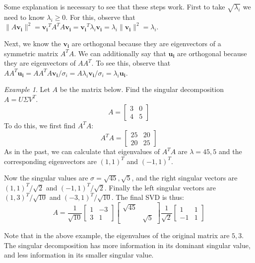 \documentclass[11pt,oneside]{amsbook}
\theoremstyle{definition}
\theoremstyle{plain}
\theoremstyle{definition}
\theoremstyle{remark}
\newtheorem{example}[theorem]{Example}
\numberwithin{equation}{section}
\numberwithin{figure}{section}
\begin{document}
Some explanation is necessary to see that these steps work. First to take $\sqrt{\lambda_i}$ we need to know $\lambda_i\geq0$. For this, observe that $\|A\mathbf{v_i}\|^2=\mathbf{v_i}^TA^TA\mathbf{v_i}=\mathbf{v_i}^T\lambda_i\mathbf{v_i}=\lambda_i\|\mathbf{v_i}\|^2=\lambda_i$.

Next, we know the $\mathbf{v_i}$ are orthogonal because they are eigenvectors of a symmetric matrix $A^TA$. We can additionally say that $\mathbf{u_i}$ are orthogonal because they are eigenvectors of $AA^T$. To see this, observe that $AA^T\mathbf{u_i}=AA^TA\mathbf{v_i}/\sigma_i=A\lambda_i\mathbf{v_i}/\sigma_i=\lambda_i\mathbf{u_i}$.

\begin{example}
  Let $A$ be the matrix below. Find the singular decomposition $A=U\Sigma V^T$.
  \[A=\begin{bmatrix}3&0\\4&5\end{bmatrix}
  \]
  To do this, we first find $A^TA$:
  \[A^TA=\begin{bmatrix}25&20\\20&25\end{bmatrix}
  \]
  As in the past, we can calculate that eigenvalues of $A^TA$ are $\lambda=45,5$ and the corresponding eigenvectors are $(1,1)^T$ and $(-1,1)^T$.
  
  Now the singular values are $\sigma=\sqrt{45},\sqrt{5}$, and the right singular vectors are $(1,1)^T/\sqrt{2}$ and $(-1,1)^T/\sqrt{2}$. Finally the left singular vectors are $(1,3)^T/\sqrt{10}$ and $(-3,1)^T/\sqrt{10}$. The final SVD is thus:
  \[A=\frac{1}{\sqrt{10}}\begin{bmatrix}1&-3\\3&1\end{bmatrix}
  \begin{bmatrix}\sqrt{45}\\&\sqrt{5}\end{bmatrix}
  \frac{1}{\sqrt{2}}\begin{bmatrix}1&1\\-1&1\end{bmatrix}
  \]
\end{example}

Note that in the above example, the eigenvalues of the original matrix are $5,3$. The singular decomposition has more information in its dominant singular value, and less information in its smaller singular value.
\end{document}
